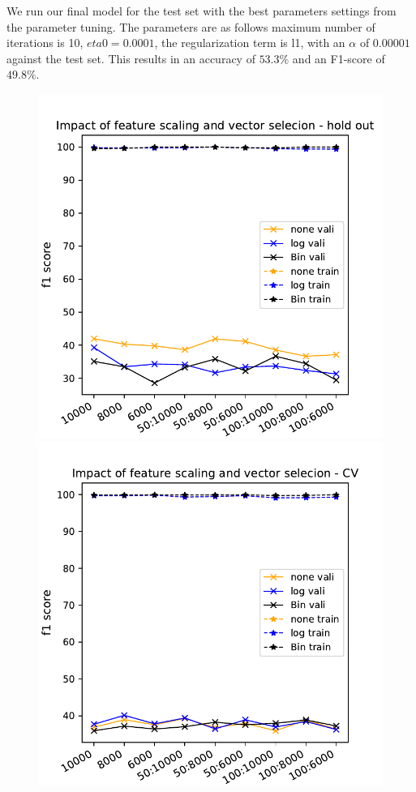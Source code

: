 \documentclass[11pt]{article}
\begin{document}
%
We run our final model for the test set with the best parameters settings from the parameter tuning. The parameters are as follows maximum number of iterations is 10, $eta0=0.0001$, the regularization term is l1, with an $\alpha$ of $0.00001$ against the test set. This results in an accuracy of $53.3\%$ and an F1-score of $49.8\%$. 
%
\begin{figure}[t]
\begin{minipage}[t]{0.33\textwidth}
\includegraphics[width=1\linewidth]{amazon/RF_scaling_vect_selection_HO.pdf}
\end{minipage}
\begin{minipage}[t]{0.33\textwidth}
\includegraphics[width=1\linewidth]{amazon/RF_scaling_vect_selection_CV.pdf}

\end{minipage}
\end{figure}
\end{document}
